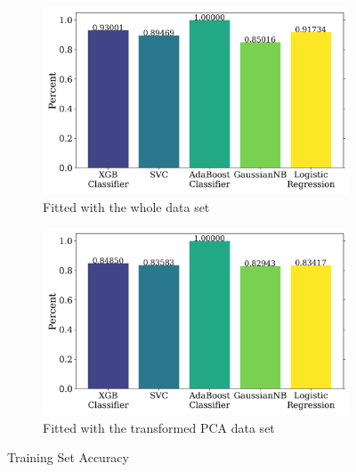 \documentclass{article}
\begin{document}
\begin{figure}[H]
    \centering
    \begin{subfigure}[t]{0.495\textwidth}
        \centering
        \includegraphics[width=\textwidth]{train_acc_notpca.png}
        \caption{Fitted with the whole data set}
        \label{fig:train_acc_notpca}
    \end{subfigure}
    \hfill
    \begin{subfigure}[t]{0.495\textwidth}
        \centering
        \includegraphics[width=\textwidth]{train_acc_pca.png}
        \caption{Fitted with the transformed PCA data set}
        \label{fig:train_acc_pca}
    \end{subfigure}
    \caption{Training Set Accuracy}
    \label{fig:train_acc}
\end{figure}
\end{document}
